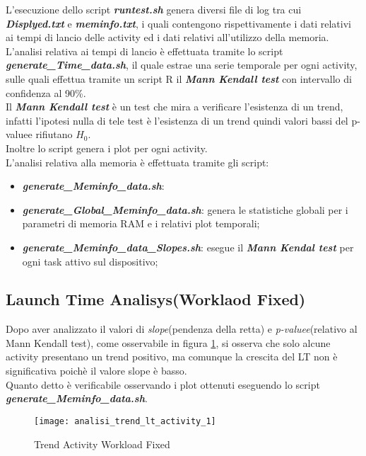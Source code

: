 L'esecuzione dello script \textbf{\textit{runtest.sh}} genera diversi file di log
tra cui \textit{\textbf{Displyed.txt}} e \textit{\textbf{meminfo.txt}}, i quali
contengono rispettivamente i dati relativi ai tempi di lancio delle activity ed
i dati relativi all'utilizzo della memoria.\\
\SONOARRIVATOQUI
L'analisi relativa ai tempi di lancio è effettuata tramite lo script \textbf{\textit{generate\_Time\_data.sh}},
il quale estrae una serie temporale per ogni activity, sulle quali effettua
tramite un script R il \textbf{\textit{Mann Kendall test}} con intervallo
di confidenza al 90\%.\\
Il \textbf{\textit{Mann Kendall test}} è un test che mira a verificare l'esistenza
di un trend, infatti l'ipotesi nulla di tele test è l'esistenza di un trend quindi
valori bassi del p-valuee rifiutano $H_0$.\\
Inoltre lo script genera i plot per ogni activity.\\
L'analisi relativa alla memoria è effettuata tramite gli script:
\begin{itemize}
  \item \textit{\textbf{generate\_Meminfo\_data.sh}}:
  \item \textit{\textbf{generate\_Global\_Meminfo\_data.sh}}: genera le statistiche
  globali per i parametri di memoria RAM e i relativi plot temporali;
  \item \textit{\textbf{generate\_Meminfo\_data\_Slopes.sh}}: esegue il \textbf{\textit{Mann Kendal test}}
  per ogni task attivo sul dispositivo;
\end{itemize}

\clearpage

\subsection{Launch Time Analisys(Worklaod Fixed)}
Dopo aver analizzato il valori di \textit{slope}(pendenza della retta) e
\textit{p-valuee}(relativo al Mann Kendall test), come osservabile in figura \ref{analisi_trend_lt_activity_1},
si osserva che solo alcune activity presentano un trend positivo, ma comunque la crescita del LT non è
significativa poichè il valore slope è basso.\\
Quanto detto è verificabile osservando i plot ottenuti eseguendo lo script  \textit{\textbf{generate\_Meminfo\_data.sh}}.
\begin{figure}[!htbp]
  \centering
  \texttt{[image: analisi\_trend\_lt\_activity\_1]}
  \caption{Trend Activity Workload Fixed}
  \label{analisi_trend_lt_activity_1}
\end{figure}

